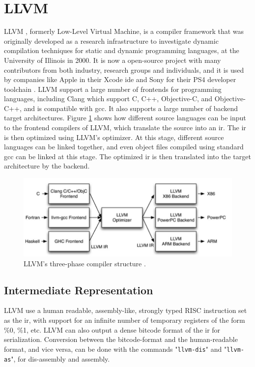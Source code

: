 \section{\label{sec:LLVM}LLVM}
LLVM \cite{LLVM:CGO04}, formerly Low-Level Virtual Machine, is a compiler framework that was originally developed as a research infrastructure to investigate dynamic compilation techniques for static and dynamic programming languages, at the University of Illinois in 2000. It is now a open-source project with many contributors from both industry, research groups and individuals, and it is used by companies like Apple in their Xcode \gls{ide} \cite{llvmapple} and Sony for their PS4 developer toolchain \cite{llvmsony}. LLVM support a large number of frontends for programming languages, including Clang \cite{clang} which support C, C++, Objective-C, and Objective-C++, and is compatible with \gls{gcc}. It also supports a large number of backend target architectures. Figure \ref{fig:llvmcompiler} shows how different source languages can be input to the frontend compilers of LLVM, which translate the source into an \gls{ir}. The \gls{ir} is then optimized using LLVM's optimizer. At this stage, different source languages can be linked together, and even object files compiled using standard \gls{gcc} can be linked at this stage. The optimized \gls{ir} is then translated into the target architecture by the backend.

\begin{figure}[hbpt]
\centering
\includegraphics[width=\textwidth]{../figs/LLVMCompiler.jpg}
\caption{\label{fig:llvmcompiler}LLVM's three-phase compiler structure \cite{llvmarch}.}
\end{figure}

\subsection{Intermediate Representation}
LLVM use a human readable, assembly-like, strongly typed RISC instruction set as the \gls{ir}, with support for an infinite number of temporary registers of the form \%0, \%1, etc. LLVM can also output a dense bitcode format of the \gls{ir} for serialization. Conversion between the bitcode-format and the human-readable format, and vice versa, can be done with the commands "\verb!llvm-dis!" and "\verb!llvm-as!", for dis-assembly and assembly.

